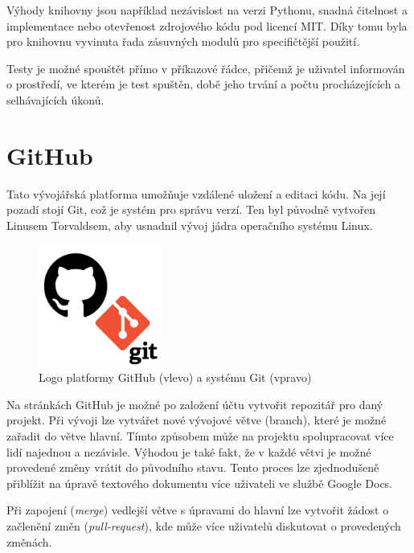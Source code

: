 \documentclass[a4paper,oneside,12pt]{book}
\begin{document}
\hspace{10mm}Výhody knihovny jsou například nezávislost na verzi Pythonu, snadná čitelnost a implementace nebo otevřenost zdrojového kódu pod licencí MIT. Díky tomu byla pro knihovnu vyvinuta řada zásuvných modulů pro specifičtější použití. \cite{Okken2017}

\hspace{10mm}Testy je možné spouštět přímo v příkazové řádce, přičemž je uživatel informován o prostředí, ve kterém je test spuštěn, době jeho trvání a počtu procházejících a selhávajících úkonů.   

\section{GitHub} \label{github}
Tato vývojářská platforma umožňuje vzdálené uložení a editaci kódu. Na její pozadí stojí Git, což je systém pro správu verzí. Ten byl původně vytvořen Linusem Torvaldsem, aby usnadnil vývoj jádra operačního systému Linux. \cite{Guthals2023}

\begin{figure}[ht] \label{obr10}
\centering
\includegraphics[height=4cm]{pictures/git.png}
\caption{Logo platformy GitHub (vlevo) a systému Git (vpravo) \cite{Guthals2023}}
\label{fig:git}
\end{figure}

\hspace{10mm}Na stránkách GitHub je možné po založení účtu vytvořit repozitář pro daný projekt. Při vývoji lze vytvářet nové vývojové větve (branch), které je možné zařadit do větve hlavní. Tímto způsobem může na projektu spolupracovat více lidí najednou a nezávisle. Výhodou je také fakt, že v každé větvi je možné provedené změny vrátit do původního stavu. Tento proces lze zjednodušeně přiblížit na úpravě textového dokumentu více uživateli ve službě Google Docs. \cite{Guthals2023}

\hspace{10mm}Při zapojení (\textit{merge}) vedlejší větve s úpravami do hlavní lze vytvořit žádost o začlenění změn (\textit{pull-request}), kde může více uživatelů diskutovat o provedených změnách. \cite{Guthals2023}
\end{document}
